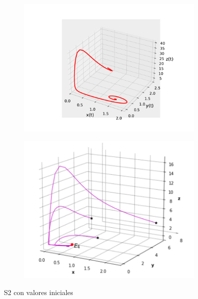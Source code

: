 \documentclass{wscpaperproc}
\theoremstyle{wsc}
\begin{document}
\begin{figure}[h]
	\centering
	\begin{subfigure}[b]{0.5\textwidth}
		\centering
		\includegraphics[width=\textwidth]{Simulations/S33d.pdf}
	
		\label{fig:comparativa3D31}
	\end{subfigure}%
	\begin{subfigure}[b]{0.5\textwidth}
		\centering
		\includegraphics[width=\textwidth]{GraficasPaper/S1[3d].png}
		\label{fig:comparativa3D32}
	\end{subfigure}
	\caption{S2 con valores iniciales}

	\label{fig:comparacion10}
\end{figure}
\end{document}
